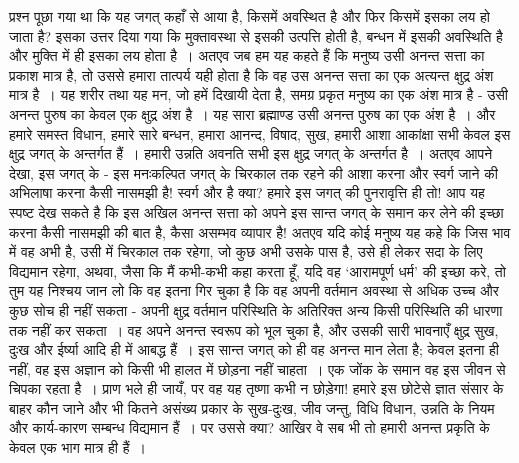प्रश्न पूछा गया था कि यह जगत् कहाँ से आया है, किसमें अवस्थित है और फिर किसमें इसका लय हो जाता है? इसका उत्तर दिया गया कि मुक्तावस्था से इसकी उत्पत्ति होती है, बन्धन में इसकी अवस्थिति है और मुक्ति में ही इसका लय होता है~। अतएव जब हम यह कहते हैं कि मनुष्य उसी अनन्त सत्ता का प्रकाश मात्र है, तो उससे हमारा तात्पर्य यही होता है कि वह उस अनन्त सत्ता का एक अत्यन्त क्षुद्र अंश मात्र है~। यह शरीर तथा यह मन, जो हमें दिखायी देता है, समग्र प्रकृत मनुष्य का एक अंश मात्र है - उसी अनन्त पुरुष का केवल एक क्षुद्र अंश है~। यह सारा ब्रह्माण्ड उसी अनन्त पुरुष का एक अंश है~। और हमारे समस्त विधान, हमारे सारे बन्धन, हमारा आनन्द, विषाद, सुख, हमारी आशा आकांक्षा सभी केवल इस क्षुद्र जगत् के अन्तर्गत हैं~। हमारी उन्नति अवनति सभी इस क्षुद्र जगत् के अन्तर्गत है~। अतएव आपने देखा, इस जगत् के - इस मनःकल्पित जगत् के चिरकाल तक रहने की आशा करना और स्वर्ग जाने की अभिलाषा करना कैसी नासमझी है! स्वर्ग और है क्या? हमारे इस जगत् की पुनरावृत्ति ही तो! आप यह स्पष्ट देख सकते है कि इस अखिल अनन्त सत्ता को अपने इस सान्त जगत् के समान कर लेने की इच्छा करना कैसी नासमझी की बात है, कैसा असम्भव व्यापार है! अतएव यदि कोई मनुष्य यह कहे कि जिस भाव में वह अभी है, उसी में चिरकाल तक रहेगा, जो कुछ अभी उसके पास है, उसे ही लेकर सदा के लिए विद्यमान रहेगा, अथवा, जैसा कि मैं कभी-कभी कहा करता हूँ, यदि वह ‘आरामपूर्ण धर्म’ की इच्छा करे, तो तुम यह निश्चय जान लो कि वह इतना गिर चुका है कि वह अपनी वर्तमान अवस्था से अधिक उच्च और कुछ सोच ही नहीं सकता - अपनी क्षुद्र वर्तमान परिस्थिति के अतिरिक्त अन्य किसी परिस्थिति की धारणा तक नहीं कर सकता~। वह अपने अनन्त स्वरूप को भूल चुका है, और उसकी सारी भावनाएँ क्षुद्र सुख, दुःख और ईर्ष्या आदि ही में आबद्ध हैं~। इस सान्त जगत् को ही वह अनन्त मान लेता है; केवल इतना ही नहीं, वह इस अज्ञान को किसी भी हालत में छोड़ना नहीं चाहता~। एक जोंक के समान वह इस जीवन से चिपका रहता है~। प्राण भले ही जायँ, पर वह यह तृष्णा कभी न छोड़ेगा! हमारे इस छोटेसे ज्ञात संसार के बाहर कौन जाने और भी कितने असंख्य प्रकार के सुख-दुःख, जीव जन्तु, विधि विधान, उन्नति के नियम और कार्य-कारण सम्बन्ध विद्यमान हैं~। पर उससे क्या? आखिर वे सब भी तो हमारी अनन्त प्रकृति के केवल एक भाग मात्र ही हैं~।

